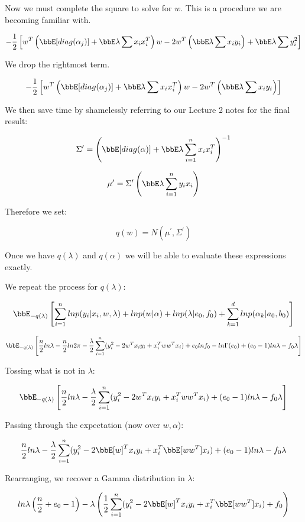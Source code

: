 \documentclass[twoside,11pt]{homework}
\begin{document}
Now we must complete the square to solve for $w$. This is a procedure we are becoming familiar with.

\[
- \frac{1}{2}  \Brackets{
w^T\Parens{\bbE[diag(\alpha_j)] + \bbE \lambda \sum x_ix_i^T}w
- 2w^T\Parens{\bbE \lambda \sum x_iy_i}
+ \bbE \lambda \sum y_i^2
}
\]

We drop the rightmost term.

\[
- \frac{1}{2}  \Brackets{
w^T\Parens{\bbE[diag(\alpha_j)] + \bbE \lambda \sum x_ix_i^T}w
- 2w^T\Parens{\bbE \lambda \sum x_iy_i}
}
\]

We then save time by shamelessly referring to our Lecture 2 notes for the final result:

\[
\Sigma^\prime = \Parens{\bbE[diag(\alpha)] + \bbE \lambda \sum_{i=1}^n x_i x_i^T}^{-1}
\]

\[
\mu^\prime = \Sigma^\prime \Parens{\bbE \lambda \sum_{i=1}^n y_i x_i}
\]

Therefore we set:

\begin{equation}
q(w) = N(\mu^\prime, \Sigma^\prime)
\end{equation}

Once we have $q(\lambda)$ and $q(\alpha)$ we will be able to evaluate these expressions exactly.

We repeat the process for $q(\lambda)$:

\[
\bbE_{-q(\lambda)} \Brackets{
 \sum_{i=1}^n  ln p(y_i | x_i, w, \lambda) + ln p(w | \alpha)
+ ln p(\lambda | e_0, f_0) + \sum_{k=1}^d ln p(\alpha_k | a_0, b_0)
}
\]


\[
\bbE_{-q(\lambda)} \Brackets{
\frac{n}{2}ln\lambda - \frac{n}{2}ln2\pi - \frac{\lambda}{2} \sum_{i=1}^n(y_i^2 - 2w^Tx_iy_i + x_i^Tww^Tx_i)
+ e_0lnf_0 - ln\Gamma(e_0) + (e_0 - 1)ln\lambda - f_0\lambda
}
\]

Tossing what is not in $\lambda$:

\[
\bbE_{-q(\lambda)} \Brackets{
\frac{n}{2}ln\lambda - \frac{\lambda}{2} \sum_{i=1}^n(y_i^2 - 2w^Tx_iy_i + x_i^Tww^Tx_i)
+ (e_0 - 1)ln\lambda - f_0\lambda
}
\]

Passing through the expectation (now over $w, \alpha$):

\[
\frac{n}{2}ln\lambda - \frac{\lambda}{2} \sum_{i=1}^n(y_i^2 - 2\bbE[w]^Tx_iy_i + x_i^T\bbE[ww^T]x_i)
+ (e_0 - 1)ln\lambda - f_0\lambda
\]

Rearranging, we recover a Gamma distribution in $\lambda$:

\[
ln\lambda \Parens{
\frac{n}{2} + e_0 - 1
} - \lambda\Parens{
\frac{1}{2} \sum_{i=1}^n(y_i^2 - 2\bbE[w]^Tx_iy_i + x_i^T\bbE[ww^T]x_i) + f_0
}
\]
\end{document}
